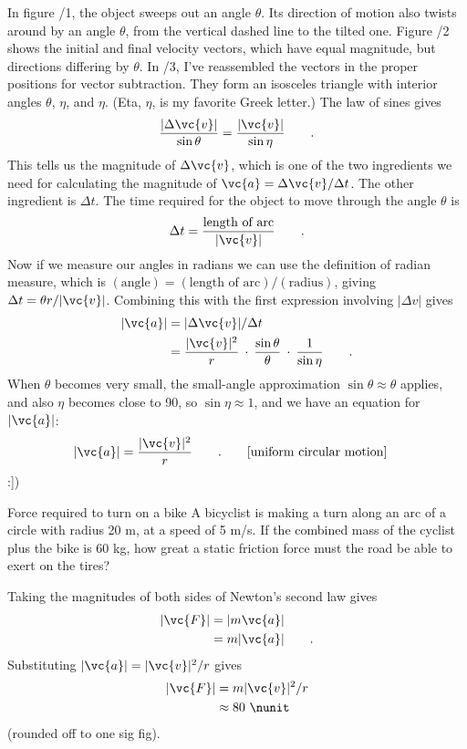 In figure /1, the object sweeps out an angle $\theta $. Its
direction of motion also twists around by an angle $\theta$,
from the vertical dashed line to the tilted one. Figure
/2
shows the initial and final velocity vectors, which have
equal magnitude, but directions differing by $\theta $. In
/3,
I've reassembled the vectors in the proper
positions for vector subtraction. They form an isosceles
triangle with interior angles $\theta$, $\eta$, and $\eta$.
(Eta, $\eta$, is my favorite Greek letter.) The law of sines gives
\begin{equation*}
  \frac{|\Delta\vc{v}|}{\sin\theta} = \frac{|\vc{v}|}{\sin\eta}       \qquad   .
\end{equation*}
This tells us the magnitude of $\Delta \vc{v}$, which is one of
the two ingredients we need for calculating the magnitude of
$\vc{a}=\Delta\vc{v}/\Delta t$. The other ingredient is $\Delta t$.
The time required for the object to move through the angle $\theta $ is
\begin{equation*}
  \Delta t = \frac{\text{length of arc}}{|\vc{v}|}   \qquad   .
\end{equation*}
Now if we measure our angles in radians we can use the
definition of radian measure, which is 
$(\text{angle})=(\text{length of arc})/(\text{radius})$,
 giving $\Delta t=\theta r/|\vc{v}|$. Combining this
with the first expression involving $|\Delta v|$ gives
\begin{align*}
        |\vc{a}|     &=  |\Delta \vc{v}|/\Delta t  \\
             &=   \frac{|\vc{v}|^2}{r} \: \cdot \: \frac{\sin\theta}{\theta} \: \cdot \: \frac{1}{\sin\eta}  \qquad   .
\end{align*}
When $\theta $ becomes very small, the small-angle
approximation $\sin \theta\approx \theta$ applies, and also $\eta $ becomes
close to 90\degunit, so $\sin  \eta \approx 1$, and we have an equation for $|\vc{a}|$:
\begin{equation*}
                |\vc{a}|  =  \frac{|\vc{v}|^2}{r} \qquad . \qquad \shoveright{\text{[uniform circular motion]}}
\end{equation*}
:])

\begin{eg}{Force required to turn on a bike}
\egquestion A bicyclist is making a turn along an arc of a
circle with radius 20 m, at a speed of 5 m/s. If the
combined mass of the cyclist plus the bike is 60 kg, how
great a static friction force must the road be able
to exert on the tires?

\eganswer Taking the magnitudes of both sides of Newton's second law gives
\begin{align*}
        |\vc{F}|     &=  |m\vc{a}|  \\
             &=  m|\vc{a}|   \qquad   .
\end{align*}
Substituting $|\vc{a}|=|\vc{v}|^2/r$ gives
\begin{align*}
        |\vc{F}|     &= m|\vc{v}|^2/r \\
                     &\approx 80\ \nunit
\end{align*}
(rounded off to one sig fig).
\end{eg}


